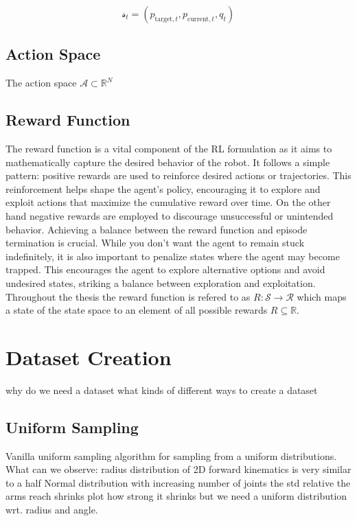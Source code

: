 \begin{equation}
    \mathcal{s}_t = (p_{\text{target}, t}, p_{\text{current}, t}, q_t)
\end{equation}\label{eqn: state}

\subsection{Action Space}

The action space $\mathcal{A} \subset \mathbb{R}^N$

\subsection{Reward Function}

The reward function is a vital component of the RL formulation as it aims to mathematically capture the desired behavior of the robot. It follows a simple pattern: positive rewards are used to reinforce desired actions or trajectories. This reinforcement helps shape the agent's policy, encouraging it to explore and exploit actions that maximize the cumulative reward over time. On the other hand negative rewards are employed to discourage unsuccessful or unintended behavior. Achieving a balance between the reward function and episode termination is crucial. While you don't want the agent to remain stuck indefinitely, it is also important to penalize states where the agent may become trapped. This encourages the agent to explore alternative options and avoid undesired states, striking a balance between exploration and exploitation. Throughout the thesis the reward function is refered to as $R: \mathcal{S} \to \mathcal{R}$ which maps a state of the state space to an element of all possible rewards $R \subseteq \mathbb{R}$.

\section{Dataset Creation}

why do we need a dataset
what kinds of different ways to create a dataset

\subsection{Uniform Sampling}

Vanilla uniform sampling algorithm for sampling from a uniform distributions.
What can we observe:
    radius distribution of 2D forward kinematics is very similar to a half Normal distribution
    with increasing number of joints the std relative the arms reach shrinks
    plot how strong it shrinks
    but we need a uniform distribution wrt. radius and angle. 

